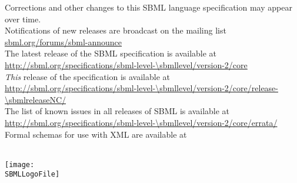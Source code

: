 \vfill

\begin{center}\sffamily
Corrections and other changes to this SBML language specification may appear over time.\\
Notifications of new releases are broadcast on the mailing list \href{http://www.sbml.org/Forums/sbml-announce}{sbml.org/forums/sbml-announce}\\[10pt]

The latest release of the SBML \thisLV specification is available at\\
\url{http://sbml.org/specifications/sbml-level-\sbmllevel/version-2/core}\\[10pt]

\emph{This} release of the specification is available at\\
\url{http://sbml.org/specifications/sbml-level-\sbmllevel/version-2/core/release-\sbmlreleaseNC/}\\[10pt]

The list of known issues in all releases of SBML \thisLV is available at\\
\url{http://sbml.org/specifications/sbml-level-\sbmllevel/version-2/core/errata/}\\[10pt]

Formal schemas for use with XML are available at\\
\sbmlSchemasURL\\[10pt]
\end{center}

\vfill

\centerline{\texttt{[image: \\SBMLLogoFile]}}
